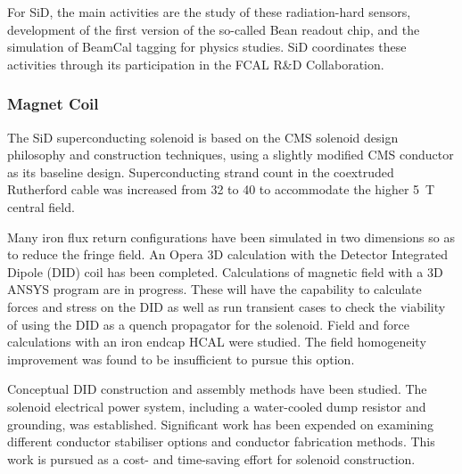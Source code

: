 For SiD, the main activities are the study of these radiation-hard sensors, development of the first version of the so-called Bean readout chip, and the simulation of BeamCal tagging for physics studies. SiD coordinates these activities through its participation in the FCAL R\&D Collaboration.

\subsubsection{Magnet Coil}

The SiD superconducting solenoid is based on the CMS solenoid
design philosophy and construction techniques, using a slightly modified CMS
conductor as its baseline design. Superconducting strand count in the coextruded
Rutherford cable was increased from 32 to 40 to accommodate the higher 5~T
central field. 

Many iron flux return configurations have been simulated in two
dimensions so as to reduce the fringe field. An Opera 3D calculation with the Detector
Integrated Dipole (DID) coil has been completed.
Calculations of magnetic field with a 3D ANSYS program
are in progress. These will have the capability to calculate forces and stress
on the DID as well as run transient cases to check the viability of using the
DID as a quench propagator for the solenoid. Field and force calculations with
an iron endcap HCAL were studied. The field homogeneity improvement was found
to be insufficient to pursue this option. 

Conceptual DID construction and
assembly methods have been studied. The solenoid electrical power system,
including a water-cooled dump resistor and grounding, was established.
Significant work has been expended on examining different conductor stabiliser
options and conductor fabrication methods. This work is pursued as a cost- and
time-saving effort for solenoid construction.

